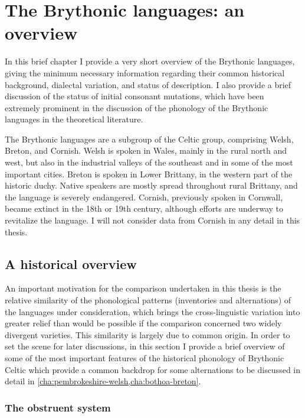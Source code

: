 \chapter{The Brythonic languages: an overview}
\label{cha:bryth-lang}

In this brief chapter I provide a very short overview of the Brythonic languages, giving the minimum necessary information regarding their common historical background, dialectal variation, and status of description. I also provide a brief discussion of the status of initial consonant mutations, which have been extremely prominent in the discussion of the phonology of the Brythonic languages in the theoretical literature.

The Brythonic languages are a subgroup of the Celtic group, comprising Welsh, Breton, and Cornish. Welsh is spoken in Wales, mainly in the rural north and west, but also in the industrial valleys of the southeast and in some of the most important cities. Breton is spoken in Lower Brittany, \ie in the western part of the historic duchy. Native speakers are mostly spread throughout rural Brittany, and the language is severely endangered. Cornish, previously spoken in Cornwall, became extinct in the 18th or 19th century, although efforts are underway to revitalize the language. I will not consider data from Cornish in any detail in this thesis.

\section{A historical overview}
\label{sec:historical-overview}

An important motivation for the comparison undertaken in this thesis is the relative similarity of the phonological patterns (\ie inventories and alternations) of the languages under consideration, which brings the cross\hyp linguistic variation into greater relief than would be possible if the comparison concerned two widely divergent varieties. This similarity is largely due to common origin. In order to set the scene for later discussions, in this section I provide a brief overview of some of the most important features of the historical phonology of Brythonic Celtic which provide a common backdrop for some alternations to be discussed in detail in \cref{cha:pembrokeshire-welsh,cha:bothoa-breton}.

\subsection{The obstruent system}
\label{sec:obstruent-system}

